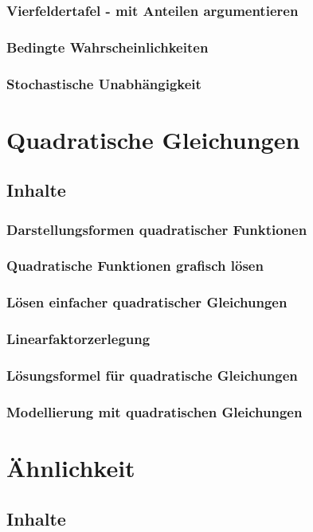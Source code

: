 \documentclass{article}
\begin{document}
\subsubsection*{Vierfeldertafel - mit Anteilen argumentieren}
\subsubsection*{Bedingte Wahrscheinlichkeiten}
\subsubsection*{Stochastische Unabhängigkeit}
\newpage
\section{Quadratische Gleichungen}
\subsection{Inhalte}
\subsubsection*{Darstellungsformen quadratischer Funktionen}
\subsubsection*{Quadratische Funktionen grafisch lösen}
\subsubsection*{Lösen einfacher quadratischer Gleichungen}
\subsubsection*{Linearfaktorzerlegung}
\subsubsection*{Lösungsformel für quadratische Gleichungen}
\subsubsection*{Modellierung mit quadratischen Gleichungen}
\newpage
\section{Ähnlichkeit}
\subsection{Inhalte}
\end{document}

